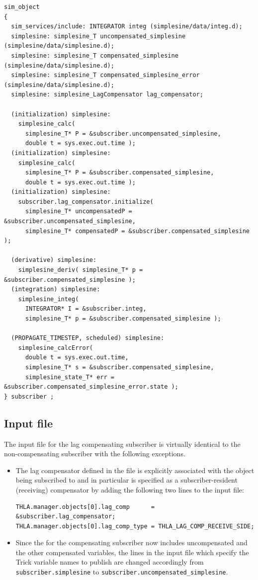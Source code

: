 \begin{lstlisting}[caption={{\tt subscriber} sim object for subscriber-side lag compensation},label={list:sub-lag-sim-object}]
sim_object
{
  sim_services/include: INTEGRATOR integ (simplesine/data/integ.d);
  simplesine: simplesine_T uncompensated_simplesine (simplesine/data/simplesine.d);
  simplesine: simplesine_T compensated_simplesine (simplesine/data/simplesine.d);
  simplesine: simplesine_T compensated_simplesine_error (simplesine/data/simplesine.d);
  simplesine: simplesine_LagCompensator lag_compensator;

  (initialization) simplesine:
    simplesine_calc(
      simplesine_T* P = &subscriber.uncompensated_simplesine,
      double t = sys.exec.out.time );
  (initialization) simplesine:
    simplesine_calc(
      simplesine_T* P = &subscriber.compensated_simplesine,
      double t = sys.exec.out.time );
  (initialization) simplesine:
    subscriber.lag_compensator.initialize(
      simplesine_T* uncompensatedP = &subscriber.uncompensated_simplesine,
      simplesine_T* compensatedP = &subscriber.compensated_simplesine );

  (derivative) simplesine:
    simplesine_deriv( simplesine_T* p = &subscriber.compensated_simplesine );
  (integration) simplesine:
    simplesine_integ(
      INTEGRATOR* I = &subscriber.integ,
      simplesine_T* p = &subscriber.compensated_simplesine );

  (PROPAGATE_TIMESTEP, scheduled) simplesine:
    simplesine_calcError(
      double t = sys.exec.out.time,
      simplesine_T* s = &subscriber.compensated_simplesine,
      simplesine_state_T* err = &subscriber.compensated_simplesine_error.state );
} subscriber ;
\end{lstlisting}

\subsection{Input file}

The input file for the lag compensating subscriber is virtually identical
to the non-compensating subscriber with the following
exceptions.
\begin{itemize}
\item{
  The lag compensator defined in the \sdefine file is explicitly
  associated with the object being subscribed to and in particular is
  specified as a subscriber-resident (receiving) compensator by adding
  the following two lines to the input file:
  \begin{verbatim}
THLA.manager.objects[0].lag_comp      = &subscriber.lag_compensator;
THLA.manager.objects[0].lag_comp_type = THLA_LAG_COMP_RECEIVE_SIDE;
  \end{verbatim}
}
\item{
  Since the \sdefine for the compensating subscriber now includes
  uncompensated and the other compensated \simplesine variables,
  the lines in the input file which specify the Trick variable names
  to publish are changed accordingly from
  {\tt subscriber.simple\-sine} to
  {\tt sub\-scrib\-er.un\-compensated\_simplesine}.
}
\end{itemize}

